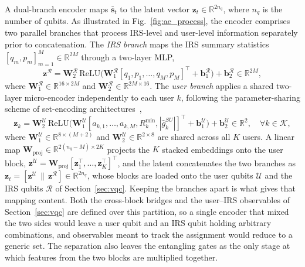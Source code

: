\documentclass[12pt,onecolumn]{IEEEtran}
\begin{document}
A dual-branch encoder maps $\bar{\mathbf{s}}_t$ to the latent vector $\mathbf{z}_t \in \mathbb{R}^{2n_q}$, where $n_q$ is the number of qubits. As illustrated in Fig.~\ref{fig:ae_process}, the encoder comprises two parallel branches that process IRS-level and user-level information separately prior to concatenation. The \emph{IRS branch} maps the IRS summary statistics $[q_m, p_m]_{m=1}^{M} \in \mathbb{R}^{2M}$ through a two-layer MLP,
\begin{equation}
    \mathbf{z}^{\mathcal{R}}
    =
    \mathbf{W}_{2}^{\mathcal{R}}
    \,\mathrm{ReLU}\bigl(
      \mathbf{W}_{1}^{\mathcal{R}}[q_1,p_1,\ldots,q_M,p_M]^\top
      + \mathbf{b}_{1}^{\mathcal{R}}
    \bigr)
    + \mathbf{b}_{2}^{\mathcal{R}}
    \in \mathbb{R}^{2M},
\end{equation}
where $\mathbf{W}_{1}^{\mathcal{R}} \in \mathbb{R}^{16 \times 2M}$ and $\mathbf{W}_{2}^{\mathcal{R}} \in \mathbb{R}^{2M \times 16}$. The \emph{user branch} applies a shared two-layer micro-encoder independently to each user $k$, following the parameter-sharing scheme of set-encoding architectures~\cite{zaheer2017deep},
\begin{equation}
    \mathbf{z}_k
    =
    \mathbf{W}_{2}^{\mathcal{U}}
    \,\mathrm{ReLU}\bigl(
      \mathbf{W}_{1}^{\mathcal{U}}[a_{k,1},\ldots,a_{k,M},R_k^{\min},|\hat{g}^{SU}_k|]^\top
      + \mathbf{b}_{1}^{\mathcal{U}}
    \bigr)
    + \mathbf{b}_{2}^{\mathcal{U}}
    \in \mathbb{R}^{2},
    \quad \forall k \in \mathcal{K},
\end{equation}
where $\mathbf{W}_{1}^{\mathcal{U}} \in \mathbb{R}^{8 \times (M+2)}$ and $\mathbf{W}_{2}^{\mathcal{U}} \in \mathbb{R}^{2 \times 8}$ are shared across all $K$ users. A linear map $\mathbf{W}_{\mathrm{proj}} \in \mathbb{R}^{2(n_q-M) \times 2K}$ projects the $K$ stacked embeddings onto the user block, $\mathbf{z}^{\mathcal{U}} = \mathbf{W}_{\mathrm{proj}}[\mathbf{z}_1^\top,\ldots,\mathbf{z}_K^\top]^\top$, and the latent concatenates the two branches as $\mathbf{z}_t = [\mathbf{z}^{\mathcal{U}} \,\|\, \mathbf{z}^{\mathcal{R}}] \in \mathbb{R}^{2n_q}$, whose blocks are loaded onto the user qubits $\mathcal{U}$ and the IRS qubits $\mathcal{R}$ of Section~\ref{sec:vqc}.
Keeping the branches apart is what gives that mapping content.
Both the cross-block bridges and the user--IRS observables of Section~\ref{sec:vqc} are defined over this partition, so a single encoder that mixed the two sides would leave a user qubit and an IRS qubit holding arbitrary combinations, and observables meant to track the assignment would reduce to a generic set.
The separation also leaves the entangling gates as the only stage at which features from the two blocks are multiplied together.
\end{document}
